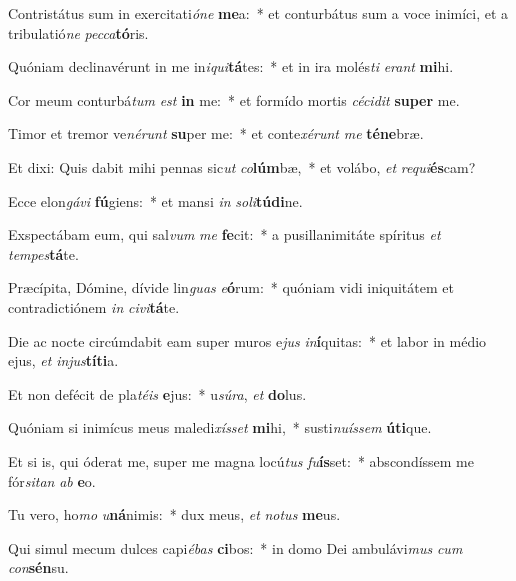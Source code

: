 \item Contristátus sum in exercitati\textit{ó}\textit{ne} \textbf{me}a:~* et conturbátus sum a voce inimíci, et a tribulatió\textit{ne} \textit{pec}\textit{ca}\textbf{tó}ris.
\item Quóniam declinavérunt in me in\textit{i}\textit{qui}\textbf{tá}tes:~* et in ira molés\textit{ti} \textit{e}\textit{rant} \textbf{mi}hi.
\item Cor meum conturbá\textit{tum} \textit{est} \textbf{in} me:~* et formído mortis \textit{cé}\textit{ci}\textit{dit} \textbf{su}\textbf{per} me.
\item Timor et tremor ve\textit{né}\textit{runt} \textbf{su}per me:~* et conte\textit{xé}\textit{runt} \textit{me} \textbf{té}\textbf{ne}bræ.
\item Et dixi: Quis dabit mihi pennas sic\textit{ut} \textit{co}\textbf{lúm}bæ,~* et volábo, \textit{et} \textit{re}\textit{qui}\textbf{és}cam?
\item Ecce elon\textit{gá}\textit{vi} \textbf{fú}giens:~* et mansi \textit{in} \textit{so}\textit{li}\textbf{tú}\textbf{di}ne.
\item Exspectábam eum, qui sal\textit{vum} \textit{me} \textbf{fe}cit:~* a pusillanimitáte spíritus \textit{et} \textit{tem}\textit{pes}\textbf{tá}te.
\item Præcípita, Dómine, dívide lin\textit{guas} \textit{e}\textbf{ó}rum:~* quóniam vidi iniquitátem et contradictiónem \textit{in} \textit{ci}\textit{vi}\textbf{tá}te.
\item Die ac nocte circúmdabit eam super muros e\textit{jus} \textit{in}\textbf{í}quitas:~* et labor in médio ejus, \textit{et} \textit{in}\textit{jus}\textbf{tí}\textbf{ti}a.
\item Et non defécit de pla\textit{té}\textit{is} \textbf{e}jus:~* u\textit{sú}\textit{ra}, \textit{et} \textbf{do}lus.
\item Quóniam si inimícus meus maledi\textit{xís}\textit{set} \textbf{mi}hi,~* susti\textit{nu}\textit{ís}\textit{sem} \textbf{ú}\textbf{ti}que.
\item Et si is, qui óderat me, super me magna locú\textit{tus} \textit{fu}\textbf{ís}set:~* abscondíssem me fór\textit{si}\textit{tan} \textit{ab} \textbf{e}o.
\item Tu vero, ho\textit{mo} \textit{u}\textbf{ná}nimis:~* dux meus, \textit{et} \textit{no}\textit{tus} \textbf{me}us.
\item Qui simul mecum dulces capi\textit{é}\textit{bas} \textbf{ci}bos:~* in domo Dei ambulávi\textit{mus} \textit{cum} \textit{con}\textbf{sén}su.

